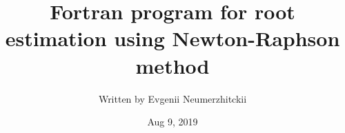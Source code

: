 \documentclass[a4paper,twoside,12pt,hidelinks]{article}
\title{Fortran program for root estimation using Newton-Raphson method}
\author{Written by Evgenii Neumerzhitckii}
\date{Aug 9, 2019}
\begin{document}
\setcounter{secnumdepth}{-1}
\renewcommand{\thepart}{}
\renewcommand{\thesection}{Part \Alph{section}}
\renewcommand{\thesubsection}{\Alph{section}.\arabic{subsection}}
\renewcommand{\partname}{}


\maketitle
\thispagestyle{empty} %

\pagebreak




\pagebreak
\end{document}
